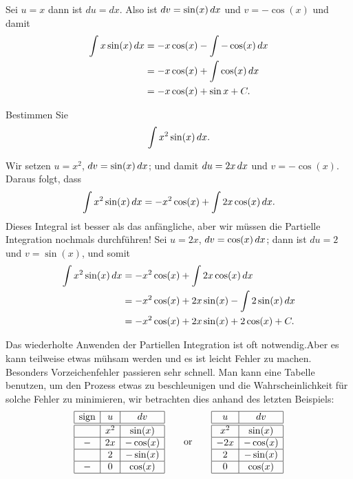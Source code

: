 \begin{solution} Sei $u=x$ dann ist $du=dx$. Also ist $dv=\sin(x)\, d x$ und $v=-\cos(x)$ und damit
\begin{align*}
\int x\sin(x)\, d x &=-x\cos(x)-\int -\cos(x)\, d x\\
&= -x\cos(x)+\int \cos(x)\, d x\\
&=-x\cos(x)+\sin x+C.
\end{align*}
\end{solution}


\begin{example}
Bestimmen Sie
\[
\int x^2\sin(x)\, d x.
\] 
\end{example}

\begin{solution}
Wir setzen $u=x^2$, $dv=\sin(x)\, d x$; und damit $du=2x\, d x$ und $v=-\cos(x)$. 
Daraus folgt, dass 
\[
\int x^2\sin(x)\, d x=-x^2\cos(x)+\int 2x\cos(x)\, d x.
\] 
Dieses Integral ist besser als das anfängliche, aber wir müssen die Partielle Integration nochmals durchführen! Sei $u=2x$, $dv=\cos(x)\, d x$; dann ist $du=2$
und $v=\sin(x)$, und somit
\begin{align*}
  \int x^2\sin(x)\, d x &=-x^2\cos(x)+\int 2x\cos(x)\, d x \\
  &=-x^2\cos(x)+ 2x\sin(x) - \int 2\sin(x)\, d x \\
  &=-x^2\cos(x)+ 2x\sin(x) + 2\cos(x) + C. 
\end{align*}
\end{solution}
Das wiederholte Anwenden der Partiellen Integration ist oft notwendig.Aber es kann teilweise etwas mühsam werden und es ist leicht Fehler zu machen. Besonders Vorzeichenfehler passieren sehr schnell. Man kann eine Tabelle benutzen, um den Prozess etwas zu beschleunigen und die Wahrscheinlichkeit für solche Fehler zu minimieren, wir betrachten dies anhand des letzten Beispiels:
\[
\begin{array}{|c|c|c|}\hline
\text{sign} & u & dv \\ \hline \hline
 & x^2 & \sin(x) \\ \hline
- & 2x & -\cos(x) \\ \hline
  & 2  & -\sin(x) \\ \hline
- & 0  & \cos(x) \\ \hline
\end{array}
\qquad\text{or}\qquad
\begin{array}{|c|c|}\hline
u & dv \\ \hline\hline
x^2 & \sin(x) \\ \hline 
-2x & -\cos(x) \\\hline
2 & -\sin(x)\\\hline
0 & \cos(x)\\\hline
\end{array}
\]

